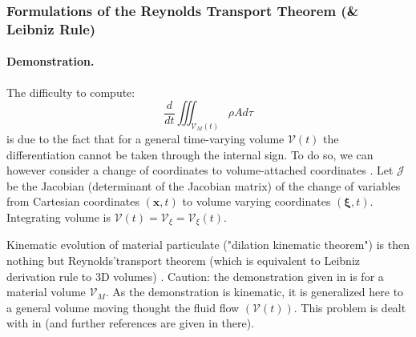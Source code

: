 \subsubsection{Formulations of the Reynolds Transport Theorem (\& Leibniz Rule)}
\paragraph{Demonstration.}
The difficulty to compute:
\begin{equation}
 \displaystyle
 \frac{d}{dt} \iiint_{\mathcal{V}_M(t)} \rho A d\tau
\end{equation}
is due to the fact that for a general time-varying volume $\mathcal{V}(t)$ the differentiation cannot be taken through the internal sign. To do so, we can however consider a change of coordinates to volume-attached coordinates \citep{hirasaki_chapter_2021}. Let $\mathcal{J}$ be the Jacobian (determinant of the Jacobian matrix) of the change of variables from Cartesian coordinates $(\mathbf{x},t)$ to volume varying coordinates $(\boldsymbol{\xi},t)$. Integrating volume is $\mathcal{V}(t)=\mathcal{V}_{\xi}=\mathcal{V}_{\xi}(t)$.

Kinematic evolution of material particulate ("dilation kinematic theorem") is then nothing but Reynolds'transport theorem (which is equivalent to Leibniz derivation rule to 3D volumes) \citep{hirasaki_chapter_2021}. Caution: the demonstration given in \citep{hirasaki_chapter_2021} is for a material volume $\mathcal{V}_M$. As the demonstration is kinematic, it is generalized here to a general volume moving thought the fluid flow $(\mathcal{V}(t))$. This problem is dealt with in \cite{web_course_web_2021} (and further references are given in there).

